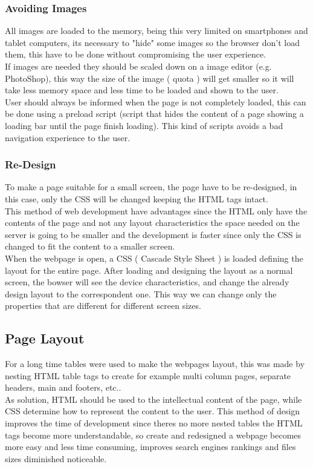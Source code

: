 \subsubsection{Avoiding Images}
All images are loaded to the memory, being this very limited on smartphones and tablet computers, its necessary to "hide" some images so the browser don't load them, this have to be done without compromising the user experience.\\
If images are needed they should be scaled down on a image editor (e.g. PhotoShop), this way the size of the image ( quota ) will get smaller so it will take less memory space and less time to be loaded and shown to the user.\\
User should always be informed when the page is not completely loaded, this can be done using a preload script (script that hides the content of a page showing a loading bar until the page finish loading). This kind of scripts avoids a bad navigation experience to the user.\\

\subsubsection{Re-Design}
To make a page suitable for a small screen, the page have to be re-designed, in this case, only the CSS will be changed keeping the HTML tags intact.\\ This method of web development have advantages since the HTML only have the contents of the page and not any layout characteristics the space needed on the server is going to be smaller and the development is faster since only the CSS is changed to fit the content to a smaller screen.\\
When the webpage is open, a CSS ( Cascade Style Sheet ) is loaded defining the layout for the entire page. After loading and designing the layout as a normal screen, the bowser will see the device characteristics, and change the already design layout to the correspondent one. This way we can change only the properties that are different for different screen sizes.\\

\subsection{Page Layout}
For a long time tables were used to make the webpages layout, this was made by nesting HTML table tags to create for example multi column pages, separate headers, main and footers, etc..\\ As solution, HTML should be used to the intellectual content of the page, while CSS determine how to represent the content to the user. This method of design improves the time of development since theres no more nested tables the HTML tags become more understandable, so create and redesigned a webpage becomes more easy and less time consuming, improves search engines rankings and files sizes diminished noticeable.\\

